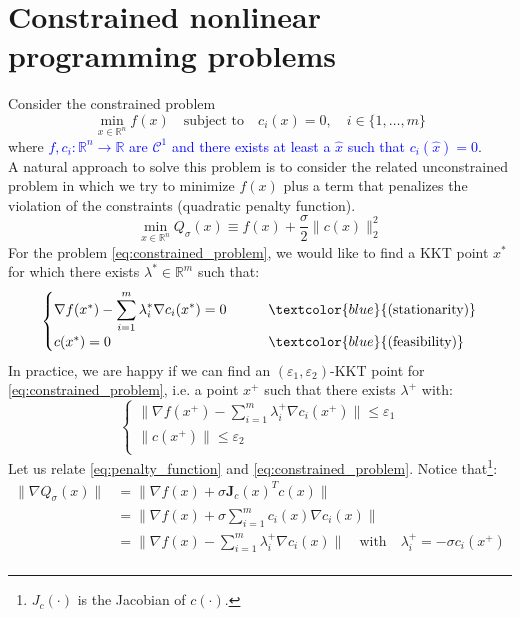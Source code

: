 \documentclass[12pt, openany]{report}
\newcommand{\R}{\mathbb{R}}
\newcommand{\C}{\mathcal{C}}
\theoremstyle{definition}
\begin{document}
\chapter{Constrained nonlinear programming problems}
Consider the constrained problem 
\begin{equation}\label{eq:constrained_problem}
	\min_{x \in \R^n} f(x) \quad \text{subject to} \quad c_i(x) = 0, \quad i \in \{1,\dots,m\}	
\end{equation}
where \textcolor{blue}{$f,c_i : \R^n \to \R$ are $\C^1$ and there exists at least a $\hat{x}$ such that $c_i(\hat{x}) = 0$}.\\
A natural approach to solve this problem is to consider the related unconstrained problem in which we try to minimize $f(x)$ plus a term that penalizes the violation of the constraints (quadratic penalty function).
\begin{equation}\label{eq:penalty_function}
	\min_{x \in \R^n} Q_{\sigma} (x) \equiv f(x) + \frac{\sigma}{2} \|c(x)\|_2^2
\end{equation}
For the problem \eqref{eq:constrained_problem}, we would like to find a KKT point $x^*$ for which there exists $\lambda^* \in \R^m$ such that:
\begin{equation}\label{eq:KKT}
	\begin{cases}
		\nabla f(x^*) - \displaystyle \sum_{i=1}^m \lambda_i^* \nabla c_i(x^*) = 0  \quad \quad &\textcolor{blue}{\text{(stationarity)}}\\
		c(x^*) = 0 &\textcolor{blue}{\text{(feasibility)}}
	\end{cases}
\end{equation}
In practice, we are happy if we can find an $(\varepsilon_1,\varepsilon_2)$-KKT point for \eqref{eq:constrained_problem}, i.e. a point $x^+$ such that there exists $\lambda^+$ with:
\begin{equation}
	\begin{cases}
		\|\nabla f(x^+) - \displaystyle \sum_{i=1}^m \lambda_i^+ \nabla c_i(x^+) \| \leq \varepsilon_1\\
		\|c(x^+)\| \leq \varepsilon_2\\
	\end{cases}
\end{equation}
Let us relate \eqref{eq:penalty_function} and \eqref{eq:constrained_problem}. Notice that\footnote{$J_c(\cdot)$ is the Jacobian of $c(\cdot)$.}:
\begin{equation}
	\begin{aligned}
		\| \nabla Q_{\sigma} (x) \| &= \|\nabla f(x) + \sigma \mathbf{J}_c(x)^T c(x)\|\\
		&= \|\nabla f(x) + \sigma \sum_{i=1}^{m} c_i(x) \nabla c_i(x)\|\\
		&= \|\nabla f(x) - \sum_{i=1}^{m} \lambda_i^+ \nabla c_i(x)\| \quad \text{with}\quad \lambda_i^+ = - \sigma c_i(x^+)\\
	\end{aligned}
\end{equation}
\end{document}
